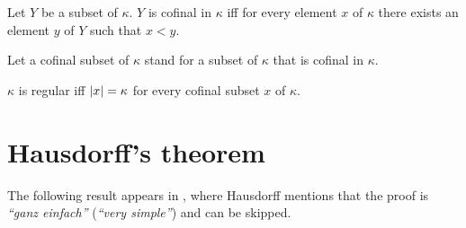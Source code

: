 \documentclass{article}
\begin{document}
  \begin{forthel}
    \begin{definition*}[Cofinality]
      Let $Y$ be a subset of $\kappa$.
      $Y$ is cofinal in $\kappa$ iff for every element $x$ of $\kappa$ there
      exists an element $y$ of $Y$ such that $x \less y$.
    \end{definition*}

    Let a cofinal subset of $\kappa$ stand for a subset of $\kappa$ that is
    cofinal in $\kappa$.

    \begin{definition*}
      $\kappa$ is regular iff $\left\vert x\right\vert = \kappa$ for every cofinal subset $x$ of
      $\kappa$.
    \end{definition*}
  \end{forthel}


  \section{Hausdorff's theorem}

  The following result appears in \cite[p.~443]{Hausdorff1908},
  where Hausdorff mentions that the proof is
  \textit{``ganz einfach''} (\textit{``very simple''}) and can be skipped.
\end{document}
